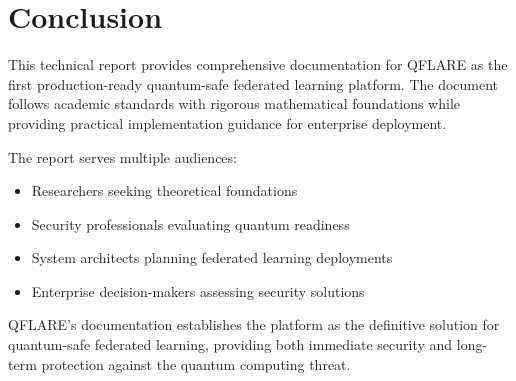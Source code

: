 \documentclass[11pt,a4paper]{article}
\begin{document}
\section{Conclusion}

This technical report provides comprehensive documentation for QFLARE as the first production-ready quantum-safe federated learning platform. The document follows academic standards with rigorous mathematical foundations while providing practical implementation guidance for enterprise deployment.

The report serves multiple audiences:
\begin{itemize}
\item Researchers seeking theoretical foundations
\item Security professionals evaluating quantum readiness
\item System architects planning federated learning deployments
\item Enterprise decision-makers assessing security solutions
\end{itemize}

QFLARE's documentation establishes the platform as the definitive solution for quantum-safe federated learning, providing both immediate security and long-term protection against the quantum computing threat.
\end{document}
